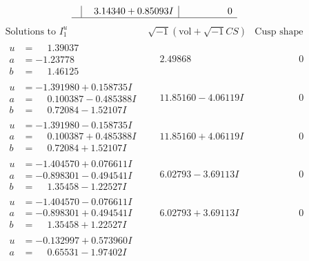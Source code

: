 \documentclass[1p]{elsarticle_modified}
\theoremstyle{definition}
\newcommand{\I}{\sqrt{-1}}
\begin{document}
$$\begin{array}{c|c|c}
 & \phantom{-}3.14340 + 0.85093 I & \phantom{-0.000000 } 0\\
 \hline 
 \end{array}$$\newpage$$\begin{array}{c|c|c}  
\text{Solutions to }I^u_{1}& \I (\text{vol} + \sqrt{-1}CS) & \text{Cusp shape}\\
 \hline 
\begin{aligned}
u &= \phantom{-}1.39037\phantom{ +0.000000I} \\
a &= -1.23778\phantom{ +0.000000I} \\
b &= \phantom{-}1.46125\phantom{ +0.000000I}\end{aligned}
 & \phantom{-}2.49868\phantom{ +0.000000I} & \phantom{-0.000000 } 0 \\ \hline\begin{aligned}
u &= -1.391980 + 0.158735 I \\
a &= \phantom{-}0.100387 - 0.485388 I \\
b &= \phantom{-}0.72084 - 1.52107 I\end{aligned}
 & \phantom{-}11.85160 - 4.06119 I & \phantom{-0.000000 } 0 \\ \hline\begin{aligned}
u &= -1.391980 - 0.158735 I \\
a &= \phantom{-}0.100387 + 0.485388 I \\
b &= \phantom{-}0.72084 + 1.52107 I\end{aligned}
 & \phantom{-}11.85160 + 4.06119 I & \phantom{-0.000000 } 0 \\ \hline\begin{aligned}
u &= -1.404570 + 0.076611 I \\
a &= -0.898301 - 0.494541 I \\
b &= \phantom{-}1.35458 - 1.22527 I\end{aligned}
 & \phantom{-}6.02793 - 3.69113 I & \phantom{-0.000000 } 0 \\ \hline\begin{aligned}
u &= -1.404570 - 0.076611 I \\
a &= -0.898301 + 0.494541 I \\
b &= \phantom{-}1.35458 + 1.22527 I\end{aligned}
 & \phantom{-}6.02793 + 3.69113 I & \phantom{-0.000000 } 0 \\ \hline\begin{aligned}
u &= -0.132997 + 0.573960 I \\
a &= \phantom{-}0.65531 - 1.97402 I \\

\end{aligned}
\end{array}$$
\end{document}
